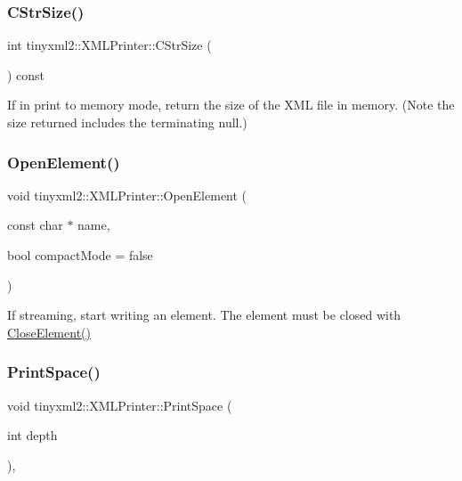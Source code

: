 \subsubsection{\texorpdfstring{C\+Str\+Size()}{CStrSize()}}
{\footnotesize\ttfamily int tinyxml2\+::\+X\+M\+L\+Printer\+::\+C\+Str\+Size (\begin{DoxyParamCaption}{ }\end{DoxyParamCaption}) const\hspace{0.3cm}{\ttfamily [inline]}}

If in print to memory mode, return the size of the X\+ML file in memory. (Note the size returned includes the terminating null.) \mbox{\label{classtinyxml2_1_1_x_m_l_printer_a20fb06c83bd13e5140d7dd13af06c010}} 
\subsubsection{\texorpdfstring{Open\+Element()}{OpenElement()}}
{\footnotesize\ttfamily void tinyxml2\+::\+X\+M\+L\+Printer\+::\+Open\+Element (\begin{DoxyParamCaption}\item[{const char $\ast$}]{name,  }\item[{bool}]{compact\+Mode = {\ttfamily false} }\end{DoxyParamCaption})}

If streaming, start writing an element. The element must be closed with \hyperlink{classtinyxml2_1_1_x_m_l_printer_af1fb439e5d800999646f333fa2f0699a}{Close\+Element()} \mbox{\label{classtinyxml2_1_1_x_m_l_printer_a1c4b2ccbe4fdb316d54f5a93f3559260}} 
\subsubsection{\texorpdfstring{Print\+Space()}{PrintSpace()}}
{\footnotesize\ttfamily void tinyxml2\+::\+X\+M\+L\+Printer\+::\+Print\+Space (\begin{DoxyParamCaption}\item[{int}]{depth }\end{DoxyParamCaption})\hspace{0.3cm}{\ttfamily [protected]}, {\ttfamily [virtual]}}

